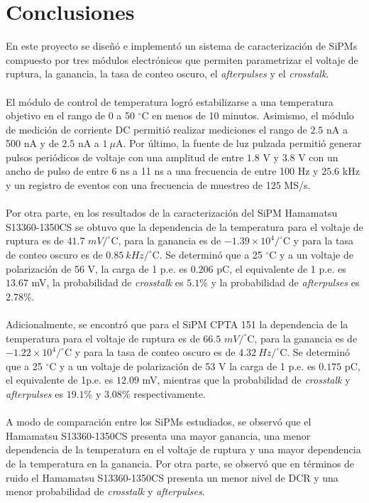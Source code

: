 \chapter{Conclusiones}
\label{Cap:Conclusiones}
En este proyecto se diseñó e implementó un sistema de caracterización de SiPMs compuesto por tres módulos electrónicos que permiten parametrizar el voltaje de ruptura, la ganancia, la tasa de conteo oscuro, el \textit{afterpulses} y el \textit{crosstalk}.\\ \\
El módulo de control de temperatura logró estabilizarse a una temperatura objetivo en el rango de 0 a 50 $^\circ$C en menos de 10 minutos. Asimismo, el módulo de medición de corriente DC permitió realizar mediciones  el rango de  $2.5$ nA a 500 nA y de $2.5$ nA a $1~\mu$A. Por último, la fuente de luz pulzada permitió generar pulsos periódicos de voltaje con una amplitud de entre $1.8$ V y $3.8$ V con un ancho de pulso de entre 6 ns a 11 ns a una frecuencia de entre 100 Hz y $25.6$ kHz y un registro de eventos con una frecuencia de muestreo de 125 MS/s.\\ \\
Por otra parte, en los resultados de la caracterización del SiPM Hamamatsu S13360-1350CS se obtuvo  que la dependencia de la temperatura para el voltaje de ruptura es de $41.7$ $mV/^\circ$C, para la ganancia es de $-1.39\times10^4/^\circ$C y para la tasa de conteo oscuro es de $0.85~kHz /^\circ$C. Se determinó que a 25 $^\circ$C y a un voltaje de polarización de 56 V, la carga de 1 p.e. es $0.206$ pC, el equivalente de 1 p.e. es $13.67$ mV, la probabilidad de \textit{crosstalk} es $5.1$\% y la probabilidad de \textit{afterpulses} es $2.78$\%.\\ \\
Adicionalmente, se encontró que para el SiPM CPTA 151 la dependencia de la temperatura para el voltaje de ruptura es de $66.5$ $mV/^\circ$C, para la ganancia es de $-1.22\times10^4/^\circ$C y para la tasa de conteo oscuro es de $ 4.32~Hz /^\circ$C. Se determinó que a 25 $^\circ$C y a un voltaje de polarización de 53 V la carga de 1 p.e. es $0.175$ pC, el equivalente de 1p.e. es $12.09$ mV, mientras que la probabilidad de \textit{crosstalk} y  \textit{afterpulses} es $19.1$\% y $3.08$\% respectivamente.\\ \\
A modo de comparación entre los SiPMs estudiados, se observó que el Hamamatsu S13360-1350CS presenta una mayor ganancia, una menor dependencia de la temperatura en el voltaje de ruptura y una mayor dependencia de la temperatura en la ganancia. Por otra parte, se observó que en términos de ruido el  Hamamatsu S13360-1350CS presenta un menor nivel de DCR y una menor probabilidad de \textit{crosstalk} y \textit{afterpulses}.\\ \\  
